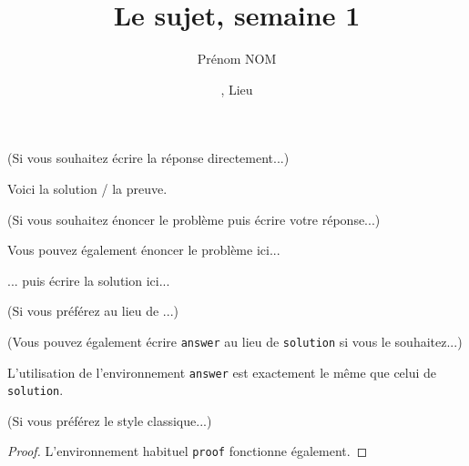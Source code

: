 \documentclass[11pt,
  logo = {example-image},
  title in boldface,
  theorem in new line,
]{homework}
\title{Le sujet, semaine 1}
\author{Prénom NOM}
\date{\TheDate{2023-12-25}, Lieu}
\begin{document}
\bigskip\textcolor{gray!55}{(Si vous souhaitez écrire la réponse directement...)}

\begin{problem}
    Voici la solution / la preuve.
\end{problem}


\bigskip\textcolor{gray!55}{(Si vous souhaitez énoncer le problème puis écrire votre réponse...)}

\begin{problem}
    Vous pouvez également énoncer le problème ici...
\end{problem}

\begin{solution}
    ... puis écrire la solution ici...
\end{solution}

\bigskip\textcolor{gray!55}{(Si vous préférez  au lieu de ...)}



\bigskip\textcolor{gray!55}{(Vous pouvez également écrire \texttt{answer} au lieu de \texttt{solution} si vous le souhaitez...)}

\begin{answer}
    L'utilisation de l'environnement \verb|answer| est exactement le même que celui de \verb|solution|.
\end{answer}


\bigskip\textcolor{gray!55}{(Si vous préférez le style classique...)}

\begin{proof}
    L'environnement habituel \verb|proof| fonctionne également.
\end{proof}


\end{document}
